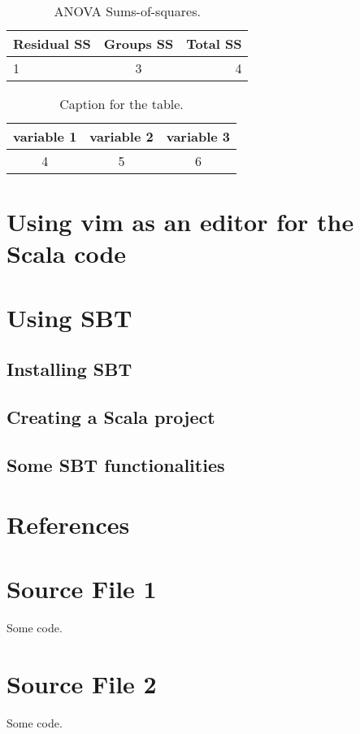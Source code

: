 \documentclass{article}
\begin{document}
\begin{table}[h!]
\centering
\caption{ANOVA Sums-of-squares.}
\label{tab: table1}
\begin{tabular}{l|c|r}

Residual SS & Groups SS & Total SS \\
\hline
1 & 3 & 4 \\

\end{tabular}
\end{table}

\begin{table}[h!]
\centering
\caption{Caption for the table.}
\label{tab: table2}
\begin{tabular}{ccc}
\toprule

variable 1 & variable 2 & variable 3 \\

\midrule

4 & 5 & 6 \\


\bottomrule
\end{tabular}
\end{table}


\section{Using vim as an editor for the Scala code}
\section{Using SBT}
\subsection{Installing SBT}
\subsection{Creating a Scala project}
\subsection{Some SBT functionalities}
\section{References}



\listoffigures
\listoftables

\begin{appendices}

\section{Source File 1}

Some code.

\section{Source File 2}

Some code.
\end{appendices}  
\end{document}
